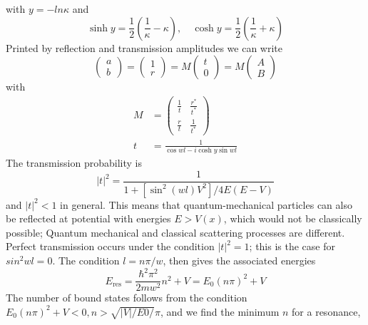 with $y = - ln \kappa$ and
\begin{equation}
    \sinh y=\frac{1}{2}\left(\frac{1}{\kappa}-\kappa\right), \quad \cosh y=\frac{1}{2}\left(\frac{1}{\kappa}+\kappa\right)
    \end{equation}
Printed by reflection and transmission amplitudes we can write
\begin{equation}
\left(\begin{array}{l}{a} \\ {b}\end{array}\right)=\left(\begin{array}{l}{1} \\ {r}\end{array}\right)=M\left(\begin{array}{l}{t} \\ {0}\end{array}\right)=M\left(\begin{array}{l}{A} \\ {B}\end{array}\right)
\end{equation}
with
\begin{equation}
\begin{aligned} M &=\left(\begin{array}{cc}{\frac{1}{t}} & {\frac{r^{*}}{t^{*}}} \\ {\frac{r}{t}} & {\frac{1}{t^{*}}}\end{array}\right) \\ t &=\frac{1}{\cos w l-i \cosh y \sin w l} \end{aligned}
\end{equation}
The transmission probability is
\begin{equation}
    |t|^{2}=\frac{1}{1+\left[\sin ^{2}(w l) V^{2}\right] / 4 E(E-V)}
    \end{equation}
and $| t |^2 <1$ in general. This means that quantum-mechanical particles can also be reflected at potential with energies $E> V (x)$, which would not be classically possible; Quantum mechanical and classical scattering processes are different. Perfect transmission occurs under the condition $| t |^2 = 1$; this is the case for $sin^ 2 wl = 0$. The condition $l = n\pi / w$,
then gives the associated energies
\begin{equation}
    E_{\mathrm{res}}=\frac{\hbar^{2} \pi^{2}}{2 m w^{2}} n^{2}+V=E_{0}(n \pi)^{2}+V
    \end{equation}
The number of bound states follows from the condition $E_0 (n\pi)^2 + V <0, n> \sqrt{| V | / E0 /} \pi$, and we find the minimum $n$ for a resonance,

